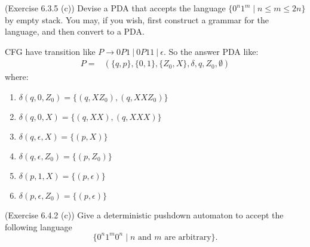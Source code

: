\documentclass[10pt]{homework}
\begin{document}
\begin{problem} (Exercise 6.3.5 (c)) Devise a PDA that accepts the language
  $\{0^{n}1^{m} \mid n \le m \le 2n \}$ by empty stack.
  You may, if you wish, first construct a grammar for the language, and then
  convert to a PDA\@.
\end{problem}

\begin{solution}
    CFG have transition like $P\rightarrow 0P 1\ |\ 0P 11\ |\ \epsilon$. So the answer PDA like:
    \begin{align}
        P=&\left( \{q,p\},\{0,1\},\{Z_0,X\},\delta,q,Z_0,\emptyset \right) \nonumber
    \end{align}
    where:
    \begin{enumerate}
        \item $\delta\left( q,0,Z_0 \right) =\{\left( q,XZ_0 \right),\left( q,XXZ_0 \right)  \}$
        \item $\delta\left( q,0,X \right) =\{\left( q,XX \right) ,\left( q,XXX \right) \}$ 
        \item $\delta\left( q,\epsilon,X \right) =\{\left( p,X \right) \}$ 
        \item $\delta\left( q,\epsilon,Z_0 \right) =\{\left( p,Z_0 \right) \}$
        \item $\delta\left( p,1,X \right) =\{\left( p,\epsilon \right) \}$ 
        \item $\delta\left( p,\epsilon,Z_0 \right) =\{\left( p,\epsilon \right) \}$
    \end{enumerate}
\end{solution}

\begin{problem} (Exercise 6.4.2 (c))
  Give a deterministic pushdown automaton to accept the following language
  \begin{equation*}
    \{0^{n}1^{m}0^{n} \mid n \text{ and } m \text{ are arbitrary}\}.
  \end{equation*}
\end{problem}
\end{document}
